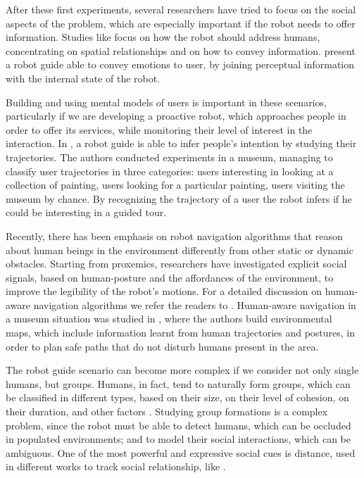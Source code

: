  After these first experiments, several researchers have tried to focus on the social aspects of the problem, which are especially important if the robot needs to offer information. Studies like \cite{yousuf2012development,evers2014development} focus on how the robot should address humans, concentrating on spatial relationships and on how to convey information.  \cite{Jensen2005} present a robot guide able to convey emotions to user, by joining perceptual information with the internal state of the robot. 

Building and using mental models of users is important in these scenarios, particularly if we are developing a proactive robot, which approaches people in order to offer its services, while monitoring their level of interest in the interaction.  In \cite{rashed2015toward}, a robot guide is able to infer people's intention by studying their trajectories. The authors conducted experiments in a museum, managing to classify user trajectories in three categories: users interesting in looking at a collection of painting, users looking for a particular painting, users visiting the museum by chance. By recognizing the trajectory of a user the robot infers if he could be interesting in a guided tour.

Recently, there has been emphasis on robot navigation algorithms that reason about human beings in the environment differently from other static or dynamic obstacles. Starting from proxemics, researchers have investigated explicit social signals, based on human-posture and the affordances of the environment, to improve the legibility of the robot's motions. For a detailed discussion on human-aware navigation algorithms we refer the readers to \cite{kruse2013human,rios-ijsr-2014}. Human-aware navigation in a museum situation was studied in \cite{samejima2015building}, where the authors build environmental maps, which include information learnt from human trajectories and postures, in order to plan safe paths that do not disturb humans present in the area. 

The robot guide scenario can become more complex if we consider not only single humans, but groups. Humans, in fact, tend to naturally form groups, which can be classified in different types, based on their size, on their level of cohesion, on their duration, and other factors \citep{forsyth2009group}.  Studying group formations is a complex problem, since the robot must be able to detect humans, which can be occluded in populated environments; and to model their social interactions, which can be ambiguous. One of the most powerful and expressive social cues is distance, used in different works to track social relationship, like \cite{luber2013multi}. 


